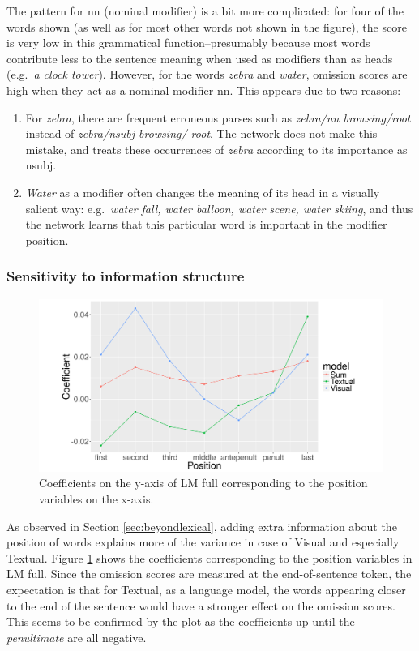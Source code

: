 The pattern for {\sc nn} (nominal modifier) is a bit more complicated: for
four of the words shown (as well as for most other words not shown in
the figure), the score is very low in this grammatical function--presumably 
because most words contribute less to the sentence meaning when used  
as modifiers than as heads (e.g.\ {\it a clock tower}). However,
for the words {\it zebra} and {\it water}, omission scores are high
when they act as a nominal modifier {\sc nn}. This appears due to two reasons:
\begin{enumerate}
\item For {\it zebra}, there are frequent erroneous parses such as {\it
    zebra/{\sc nn} browsing/{\sc root}} instead of {\it zebra/{\sc nsubj} browsing/{\sc
    root}}. The network does not make this mistake, and treats these
    occurrences of {\it zebra} according to its importance as {\sc nsubj}.
\item {\it Water} as a modifier often changes the meaning of its head in
 a visually salient way: e.g.\ {\it water fall, water balloon, water scene, water skiing}, and
  thus the network learns that this particular word is important in the modifier position.
\end{enumerate}

\subsubsection{Sensitivity to information structure}
\label{subsec:information-struct}

\begin{figure}
\centering
 \includegraphics[scale=0.4]{omission-stat/position-coef.png}
 \caption{Coefficients on the y-axis of {\sc LM full} corresponding to the
position variables on the x-axis.}
 \label{fig:posrqs}
\end{figure}
 
As observed in Section \ref{sec:beyondlexical}, 
adding extra information about the position of words 
explains more of the variance in case of {\sc Visual} and especially {\sc Textual}.
Figure \ref{fig:posrqs} shows the coefficients corresponding to the
position variables in {\sc LM full}. Since the omission scores 
are measured at the end-of-sentence token, the expectation is that 
for {\sc Textual}, as a language model,  
the words appearing closer to the end of the sentence would have a
stronger effect on the omission scores. This seems to be confirmed by
the plot as the coefficients up until the \emph{penultimate} are all negative.



